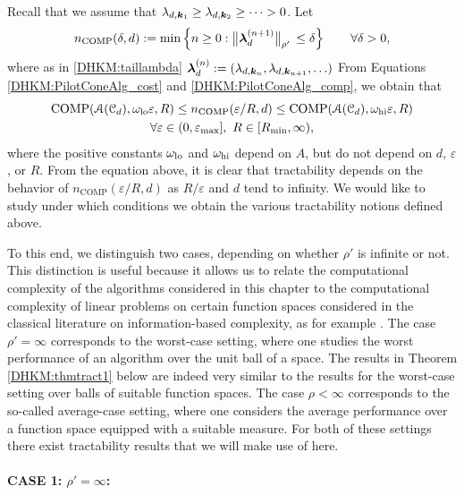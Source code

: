 \documentclass[USenglish]{article}
\theoremstyle{dgthm}
\theoremstyle{dgthm}
\theoremstyle{dgthm}
\theoremstyle{dgthm}
\theoremstyle{dgdef}
\theoremstyle{definition}
\DeclareMathOperator{\COMP}{COMP}
\newcommand{\bignorm}[2][{}]{\ensuremath{\bigl \lVert #2 \bigr \rVert}_{#1}}
\begin{document}
Recall that we assume that 
$\lambda_{d,{\boldsymbol{k}}_1}\geq \lambda_{d,{\boldsymbol{k}}_2}\geq \cdots >0$. Let 
\[
n_{\COMP}(\delta,d) :=\min \left \{n\ge 0: \bignorm[\rho']{\bslambda^{(n+1)}_d} \,
    \le \delta \right \} \qquad \forall \delta > 0,
\]
where as in \eqref{DHKM:taillambda} ${\boldsymbol{\lambda}}_d^{(n)} := (\lambda_{d,{\boldsymbol{k}}_n}, \lambda_{d,{\boldsymbol{k}}_{n+1}}, \ldots )$
From 
Equations \eqref{DHKM:PilotConeAlg_cost} and \eqref{DHKM:PilotConeAlg_comp}, we obtain that 
\begin{multline*}
     \COMP(\calA(\calC_d),\omega_{\textup{lo}} \varepsilon,R) \le n_{\COMP}(\varepsilon/R,d) \le 
        \COMP(\calA(\calC_d),\omega_{\textup{hi}} \varepsilon,R)  \\
        \forall \varepsilon \in (0, \varepsilon_{\max}], \ R \in [R_{\min}, \infty),
\end{multline*}
where the positive constants $\omega_{\textup{lo}}$ and $\omega_{\textup{hi}}$  depend on $A$, but do not depend on $d$, $\varepsilon$, or $R$.  From the equation above, it is clear that tractability depends on the behavior of $n_{\COMP}(\varepsilon/R,d)$ as $R/\varepsilon$ and $d$ tend to infinity. We would like to study under which conditions we obtain the various tractability notions defined above.

To this end, we distinguish two cases, depending on whether $\rho'$ is infinite or not. This 
distinction is useful because it allows us to relate the computational complexity of the algorithms 
considered in this chapter to the computational complexity of linear problems on certain function spaces considered in the classical literature on information-based complexity, as for example \cite{NovWoz08a}. The case $\rho'=\infty$ corresponds to the
worst-case setting, where one studies the worst performance of an algorithm over the unit ball of 
a space. The results in Theorem \ref{DHKM:thmtract1} below are indeed very similar to the results 
for the worst-case setting over balls of suitable function spaces. The case $\rho<\infty$ corresponds to the so-called average-case setting, where one 
considers the average performance over a function space equipped with a suitable measure. 
For both of these settings there exist tractability results that we will make use of here.



\paragraph*{CASE 1: $\rho'=\infty$:}
\end{document}
